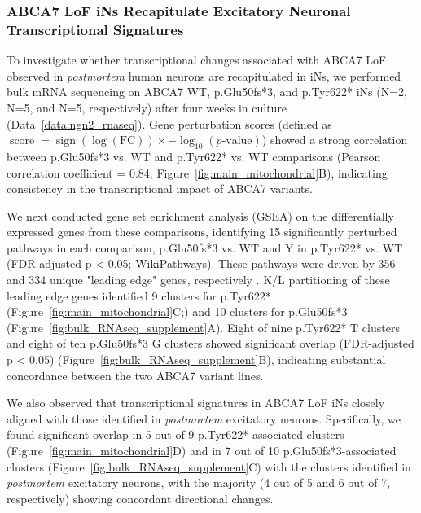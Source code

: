 \documentclass[12pt]{article}
\begin{document}
\subsubsection{ABCA7 LoF iNs Recapitulate Excitatory Neuronal Transcriptional Signatures}
To investigate whether transcriptional changes associated with ABCA7 LoF observed in \emph{postmortem} human neurons are recapitulated in iNs, we performed bulk mRNA sequencing on ABCA7 WT, p.Glu50fs*3, and p.Tyr622* iNs (N=2, N=5, and N=5, respectively) after four weeks in culture (Data~\ref{data:ngn2_rnaseq}). Gene perturbation scores (defined as $\operatorname{score} = \operatorname{sign}(\log(\text{FC})) \times -\log_{10}(p\text{-value})$) showed a strong correlation between p.Glu50fs*3 vs. WT and p.Tyr622* vs. WT comparisons (Pearson correlation coefficient = 0.84; Figure~\ref{fig:main_mitochondrial}B), indicating consistency in the transcriptional impact of ABCA7 variants.

We next conducted gene set enrichment analysis (GSEA) on the differentially expressed genes from these comparisons, identifying 15 significantly perturbed pathways in each comparison, p.Glu50fs*3 vs. WT and Y in p.Tyr622* vs. WT (FDR-adjusted p < 0.05; WikiPathways). 
These pathways were driven by 356 and 334 unique "leading edge" genes, respectively \cite{Subramanian2005-pu}. K/L partitioning of these leading edge genes identified 9 clusters for p.Tyr622* (Figure~\ref{fig:main_mitochondrial}C;) and 10 clusters for p.Glu50fs*3 (Figure~\ref{fig:bulk_RNAseq_supplement}A). Eight of nine p.Tyr622* T clusters and eight of ten p.Glu50fs*3 G clusters showed significant overlap (FDR-adjusted p < 0.05) (Figure~\ref{fig:bulk_RNAseq_supplement}B), indicating substantial concordance between the two ABCA7 variant lines.

We also observed that transcriptional signatures in ABCA7 LoF iNs closely aligned with those identified in \textit{postmortem} excitatory neurons. Specifically, we found significant overlap in 5 out of 9 p.Tyr622*-associated clusters (Figure~\ref{fig:main_mitochondrial}D) and in 7 out of 10 p.Glu50fs*3-associated clusters (Figure~\ref{fig:bulk_RNAseq_supplement}C) with the clusters identified in \textit{postmortem} excitatory neurons, with the majority (4 out of 5 and 6 out of 7, respectively) showing concordant directional changes.
\end{document}
